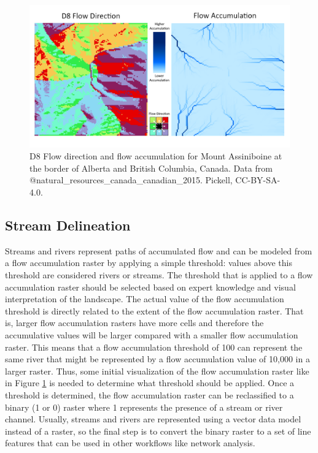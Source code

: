 \documentclass[
]{book}
\begin{document}
\begin{figure}
\includegraphics[width=0.75\linewidth]{images/09-mount-assiniboine-flow-dir-acc} \caption{D8 Flow direction and flow accumulation for Mount Assiniboine at the border of Alberta and British Columbia, Canada. Data from @natural_resources_canada_canadian_2015. Pickell, CC-BY-SA-4.0.}\label{fig:9-mount-assiniboine-flow-dir-acc}
\end{figure}

\subsection{Stream Delineation}\label{stream-delineation}

Streams and rivers represent paths of accumulated flow and can be modeled from a flow accumulation raster by applying a simple threshold: values above this threshold are considered rivers or streams. The threshold that is applied to a flow accumulation raster should be selected based on expert knowledge and visual interpretation of the landscape. The actual value of the flow accumulation threshold is directly related to the extent of the flow accumulation raster. That is, larger flow accumulation rasters have more cells and therefore the accumulative values will be larger compared with a smaller flow accumulation raster. This means that a flow accumulation threshold of 100 can represent the same river that might be represented by a flow accumulation value of 10,000 in a larger raster. Thus, some initial visualization of the flow accumulation raster like in Figure \ref{fig:9-mount-assiniboine-flow-dir-acc} is needed to determine what threshold should be applied. Once a threshold is determined, the flow accumulation raster can be reclassified to a binary (1 or 0) raster where 1 represents the presence of a stream or river channel. Usually, streams and rivers are represented using a vector data model instead of a raster, so the final step is to convert the binary raster to a set of line features that can be used in other workflows like network analysis.
\end{document}
